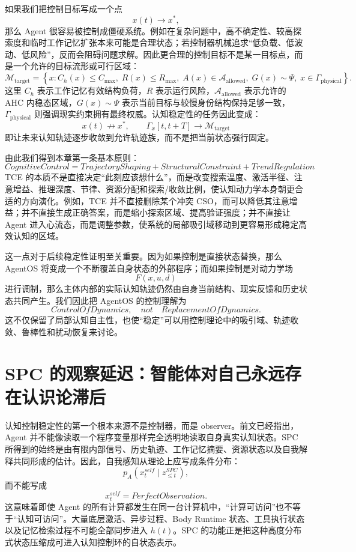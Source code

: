 如果我们把控制目标写成一个点
\[
x(t)\rightarrow x^{*},
\]
那么 Agent 很容易被控制成僵硬系统。例如在复杂问题中，高不确定性、较高探索度和临时工作记忆扩张本来可能是合理状态；若控制器机械追求“低负载、低波动、低风险”，反而会阻碍问题求解。因此更合理的控制目标不是某一目标点，而是一个允许的目标流形或可行区域：
\[
\mathcal{M}_{\mathrm{target}}
=
\left\{
x:
C_h(x)\le C_{\max},
\;
R(x)\le R_{\max},
\;
A(x)\in\mathcal{A}_{\mathrm{allowed}},
\;
G(x)\sim\Psi,
\;
x\in\Gamma_{\mathrm{physical}}
\right\}.
\]
这里 $C_h$ 表示工作记忆有效结构负荷，$R$ 表示运行风险，$\mathcal{A}_{\mathrm{allowed}}$ 表示允许的 AHC 内稳态区域，$G(x)\sim\Psi$ 表示当前目标与较慢身份结构保持足够一致，$\Gamma_{\mathrm{physical}}$ 则强调现实约束拥有最终权威。认知稳定性的任务因此变成：
\[
\boxed{
x(t)\not\rightarrow x^{*},
\qquad
\Gamma_{x}[t,t+T]
\rightarrow
\mathcal{M}_{\mathrm{target}}
}
\]
即让未来认知轨迹逐步收敛到允许轨迹族，而不是把当前状态强行固定。

由此我们得到本章第一条基本原则：
\[
\boxed{
CognitiveControl
=
TrajectoryShaping
+
StructuralConstraint
+
TrendRegulation
}
\]
TCE 的本质不是直接决定“此刻应该想什么”，而是改变搜索温度、激活半径、注意增益、推理深度、节律、资源分配和探索/收敛比例，使认知动力学本身朝更合适的方向演化。例如，TCE 并不直接删除某个冲突 CSO，而可以降低其注意增益；并不直接生成正确答案，而是缩小探索区域、提高验证强度；并不直接让 Agent 进入心流态，而是调整参数，使系统的局部吸引域移动到更容易形成稳定高效认知的区域。

这一点对于后续稳定性证明至关重要。因为如果控制是直接状态替换，那么 AgentOS 将变成一个不断覆盖自身状态的外部程序；而如果控制是对动力学场
\[
F(x,u,d)
\]
进行调制，那么主体内部的实际认知轨迹仍然由自身当前结构、现实反馈和历史状态共同产生。我们因此把 AgentOS 的控制理解为
\[
\boxed{
ControlOfDynamics,
\quad
not\quad
ReplacementOfDynamics.
}
\]
这不仅保留了局部认知自主性，也使“稳定”可以用控制理论中的吸引域、轨迹收敛、鲁棒性和扰动恢复来讨论。

\section{SPC 的观察延迟：智能体对自己永远存在认识论滞后}

认知控制稳定性的第一个根本来源不是控制器，而是 observer。前文已经指出，Agent 并不能像读取一个程序变量那样完全透明地读取自身真实认知状态。SPC 所得到的始终是由有限内部信号、历史轨迹、工作记忆摘要、资源状态以及自我解释共同形成的估计。因此，自我感知从理论上应写成条件分布：
\[
p_A
\left(
x_t^{self}
\mid
z_{\le t}^{SPC}
\right),
\]
而不能写成
\[
x_t^{self}
=
PerfectObservation.
\]
这意味着即使 Agent 的所有计算都发生在同一台计算机中，``计算可访问''也不等于``认知可访问''。大量底层激活、异步过程、Body Runtime 状态、工具执行状态以及记忆检索过程不可能全部同步进入 $h(t)$。SPC 的功能正是把这种高度分布式状态压缩成可进入认知控制环的自状态表示。

